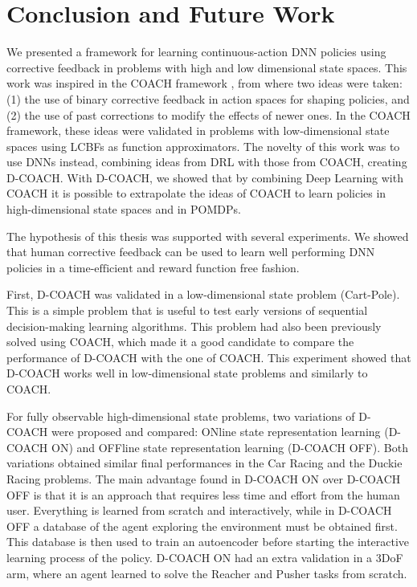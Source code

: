 \chapter{Conclusion and Future Work}
We presented a framework for learning continuous-action DNN policies using corrective feedback in problems with high and low dimensional state spaces. This work was inspired in the COACH framework \cite{Celemin2018AnInteractive}, from where two ideas were taken: (1) the use of binary corrective feedback in action spaces for shaping policies, and (2) the use of past corrections to modify the effects of newer ones. In the COACH framework, these ideas were validated in problems with low-dimensional state spaces using LCBFs as function approximators. The novelty of this work was to use DNNs instead, combining ideas from DRL with those from COACH, creating D-COACH. With D-COACH, we showed that by combining Deep Learning with COACH it is possible to extrapolate the ideas of COACH to learn policies in high-dimensional state spaces and in POMDPs. 

The hypothesis of this thesis was supported with several experiments. We showed that human corrective feedback can be used to learn well performing DNN policies in a $\text{time-efficient}$ and reward function free fashion.

First, D-COACH was validated in a low-dimensional state problem (Cart-Pole). This is a simple problem that is useful to test early versions of sequential decision-making learning algorithms. This problem had also been previously solved using COACH, which made it a good candidate to compare the performance of D-COACH with the one of COACH. This experiment showed that D-COACH works well in low-dimensional state problems and similarly to COACH. 

For fully observable high-dimensional state problems, two variations of D-COACH were proposed and compared: ONline state representation learning (D-COACH ON) and OFFline state representation learning (D-COACH OFF). Both variations obtained similar final performances in the Car Racing and the Duckie Racing problems. The main advantage found in D-COACH ON over D-COACH OFF is that it is an approach that requires less time and effort from the human user. Everything is learned from scratch and interactively, while in D-COACH OFF a database of the agent exploring the environment must be obtained first. This database is then used to train an autoencoder before starting the interactive learning process of the policy. D-COACH ON had an extra validation in a 3DoF arm, where an agent learned to solve the Reacher and Pusher tasks from scratch.

